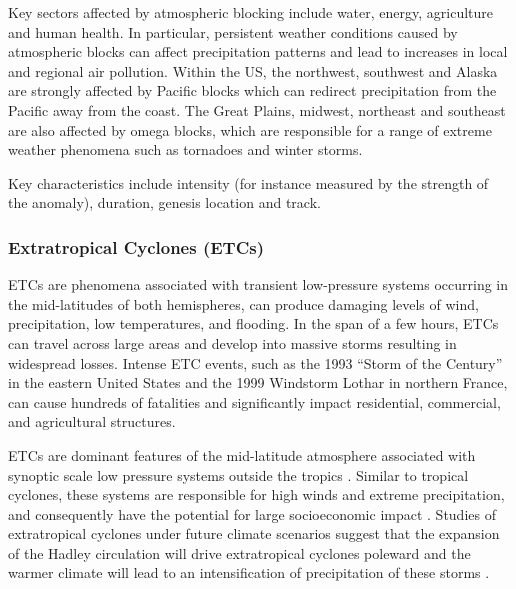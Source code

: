 \documentclass[11pt]{article}
\begin{document}

Key sectors affected by atmospheric blocking include water, energy, agriculture and human health.  In particular, persistent weather conditions caused by atmospheric blocks can affect precipitation patterns and lead to increases in local and regional air pollution.  Within the US, the northwest, southwest and Alaska are strongly affected by Pacific blocks which can redirect precipitation from the Pacific away from the coast.  The Great Plains, midwest, northeast and southeast are also affected by omega blocks, which are responsible for a range of extreme weather phenomena such as tornadoes and winter storms.

Key characteristics include intensity (for instance measured by the strength of the anomaly), duration, genesis location and track.

\subsubsection{Extratropical Cyclones (ETCs)}

ETCs are phenomena associated with transient low-pressure systems occurring in the mid-latitudes of both hemispheres, can produce damaging levels of wind, precipitation, low temperatures, and flooding. In the span of a few hours, ETCs can travel across large areas and develop into massive storms resulting in widespread losses. Intense ETC events, such as the 1993 ``Storm of the Century'' in the eastern United States and the 1999 Windstorm Lothar in northern France, can cause hundreds of fatalities and significantly impact residential, commercial, and agricultural structures.

ETCs are dominant features of the mid-latitude atmosphere associated with synoptic scale low pressure systems outside the tropics \citep{serreze1995climatological}.  Similar to tropical cyclones, these systems are responsible for high winds and extreme precipitation, and consequently have the potential for large socioeconomic impact \citep{ulbrich2009extra}.  Studies of extratropical cyclones under future climate scenarios suggest that the expansion of the Hadley circulation will drive extratropical cyclones poleward \citep{bengtsson2006storm} and the warmer climate will lead to an intensification of precipitation of these storms \citep{bengtsson2009will, zappa2013multi}.
\end{document}
